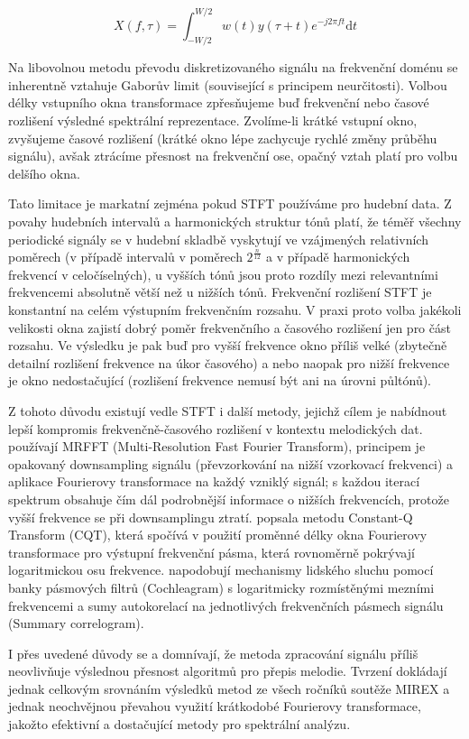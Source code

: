 $$X(f, \tau) = \int_{-W/2}^{W/2}{w(t)y(\tau + t)e^{-j2\pi f t} \mathrm{d}t}$$

Na libovolnou metodu převodu diskretizovaného signálu na frekvenční doménu se inherentně vztahuje Gaborův limit (související s principem neurčitosti). Volbou délky vstupního okna transformace zpřesňujeme buď frekvenční nebo časové rozlišení výsledné spektrální reprezentace. Zvolíme-li krátké vstupní okno, zvyšujeme časové rozlišení (krátké okno lépe zachycuje rychlé změny průběhu signálu), avšak ztrácíme přesnost na frekvenční ose, opačný vztah platí pro volbu delšího okna.

Tato limitace je markatní zejména pokud STFT používáme pro hudební data. Z povahy hudebních intervalů a harmonických struktur tónů platí, že téměř všechny periodické signály se v hudební skladbě vyskytují ve vzájmených relativních poměrech (v případě intervalů v poměrech $2^{\frac{n}{12}}$ a v případě harmonických frekvencí v celočíselných), u vyšších tónů jsou proto rozdíly mezi relevantními frekvencemi absolutně větší než u nižších tónů. Frekvenční rozlišení STFT je konstantní na celém výstupním frekvenčním rozsahu. V praxi proto volba jakékoli velikosti okna zajistí dobrý poměr frekvenčního a časového rozlišení jen pro část rozsahu. Ve výsledku je pak buď pro vyšší frekvence okno příliš velké (zbytečně detailní rozlišení frekvence na úkor časového) a nebo naopak pro nižší frekvence je okno nedostačující (rozlišení frekvence nemusí být ani na úrovni půltónů).

Z tohoto důvodu existují vedle STFT i další metody, jejichž cílem je nabídnout lepší kompromis frekvenčně-časového rozlišení v kontextu melodických dat. \cite{Goto1999} používají MRFFT (Multi-Resolution Fast Fourier Transform), principem je opakovaný downsampling signálu (převzorkování na nižší vzorkovací frekvenci) a aplikace Fourierovy transformace na každý vzniklý signál; s každou iterací spektrum obsahuje čím dál podrobnější informace o nižších frekvencích, protože vyšší frekvence se při downsamplingu ztratí. \cite{Brown1990} popsala metodu Constant-Q Transform (CQT), která spočívá v použití proměnné délky okna Fourierovy transformace pro výstupní frekvenční pásma, která rovnoměrně pokrývají logaritmickou osu frekvence. \cite{Paiva2004} napodobují mechanismy lidského sluchu pomocí banky pásmových filtrů (Cochleagram) s logaritmicky rozmístěnými mezními frekvencemi a sumy autokorelací na jednotlivých frekvenčních pásmech signálu (Summary correlogram).

I přes uvedené důvody se \cite{Salamon2014} a \cite{Dressler2016} domnívají, že metoda zpracování signálu příliš neovlivňuje výslednou přesnost algoritmů pro přepis melodie. Tvrzení dokládají jednak celkovým srovnáním výsledků metod ze všech ročníků soutěže MIREX a jednak neochvějnou převahou využití krátkodobé Fourierovy transformace, jakožto efektivní a dostačující metody pro spektrální analýzu.

